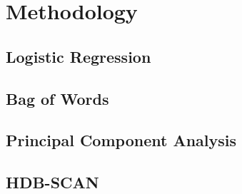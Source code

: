 \chapter{Methodology}
\section{Logistic Regression}
\section{Bag of Words}
\section{Principal Component Analysis}
\section{HDB-SCAN}
